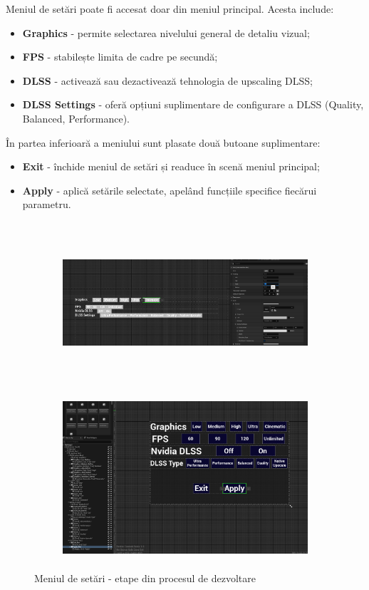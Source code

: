Meniul de setări poate fi accesat doar din meniul principal. Acesta include:
\begin{itemize}
    \item \textbf{Graphics} - permite selectarea nivelului general de detaliu vizual;
    \item \textbf{FPS} - stabilește limita de cadre pe secundă;
    \item \textbf{DLSS} - activează sau dezactivează tehnologia de upscaling DLSS;
    \item \textbf{DLSS Settings} - oferă opțiuni suplimentare de configurare a DLSS (Quality, Balanced, Performance).
\end{itemize}


În partea inferioară a meniului sunt plasate două butoane suplimentare:
\begin{itemize}
\item \textbf{Exit} - închide meniul de setări și readuce în scenă meniul principal;
\item \textbf{Apply} - aplică setările selectate, apelând funcțiile specifice fiecărui parametru.
\end{itemize}


\newpage

\begin{figure}[h!]
    \centering
    \begin{subfigure}{0.49\textwidth}
        \includegraphics[width=\linewidth, height=6cm]{continut/capitol3/figuri/settings2.png}
        \label{fig:Menu}
    \end{subfigure}
    \hfill
    \begin{subfigure}{0.49\textwidth}
        \includegraphics[width=\linewidth, height=6cm]{continut/capitol3/figuri/settings3.png}
        \label{fig:Menu}
    \end{subfigure}
    \caption{Meniul de setări - etape din procesul de dezvoltare}
\end{figure}

